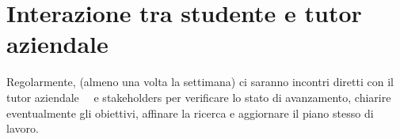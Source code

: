 
\section{Interazione tra studente e tutor aziendale}
	Regolarmente, (almeno una volta la settimana) ci saranno incontri diretti con il tutor aziendale \nomeTutorAziendale\ \cognomeTutorAziendale\ e stakeholders per verificare lo stato di avanzamento, chiarire eventualmente gli obiettivi, affinare la ricerca e aggiornare il piano stesso di lavoro.

	
